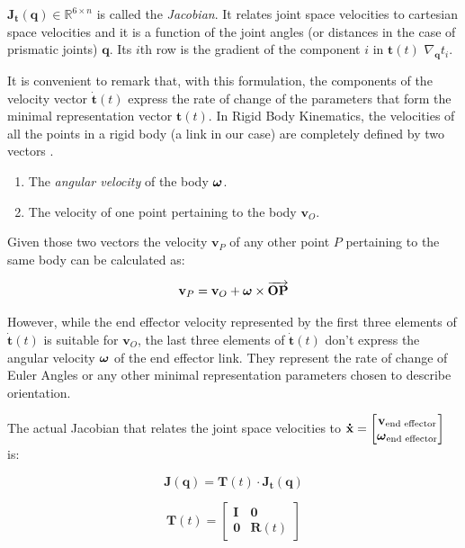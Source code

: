 $\mathbf{J}_{\mathbf{t}}(\mathbf{{q}}) \in \mathbb{R}^{6 \times n}$ is called the \textit{Jacobian}. It relates joint space velocities to cartesian space velocities and it is a function of the joint angles (or distances in the case of prismatic joints) $\mathbf{{q}}$. Its $i$th row is the gradient of the component $i$ in $\mathbf{t}(t)$ $\nabla_{\mathbf{q}}{t}_i$.

It is convenient to remark that, with this formulation, the components of the velocity vector $\mathbf{\dot{t}}(t)$ express the rate of change of the parameters that form the minimal representation vector $\mathbf{t}(t)$. In Rigid Body Kinematics, the velocities of all the points in a rigid body (a link in our case) are completely defined by two vectors \cite{Ruigomez2010}.

\begin{enumerate}
    \item The \textit{angular velocity} of the body $\mbox{\boldmath$\omega$}$.
    \item The velocity of one point pertaining to the body $\mathbf{v}_{O}$.
\end{enumerate}

Given those two vectors the velocity $\mathbf{v}_{P}$ of any other point $P$ pertaining to the same body can be calculated as:

\begin{equation}
\label{eq:velfield}
\mathbf{v}_{P} = \mathbf{v}_{O} + \mbox{\boldmath$\omega$} \times \overrightarrow{\mathbf{OP}}
\end{equation}

However, while the end effector velocity represented by the first three elements of $\mathbf{\dot{t}}(t)$ is suitable for $\mathbf{v}_{O}$, the last three elements of $\mathbf{\dot{t}}(t)$ don't express the angular velocity $\mbox{\boldmath$\omega$}$ of the end effector link. They represent the rate of change of Euler Angles or any other minimal representation parameters chosen to describe orientation.

The actual Jacobian that relates the joint space velocities to $\mathbf{\dot{x}} = \begin{bmatrix} \mathbf{v}_{\text{end effector}} \\ \mbox{\boldmath$\omega$}_{\text{end effector}} \end{bmatrix}$ is:

$$
\mathbf{J}(\mathbf{{q}}) = \mathbf{T}(t) \cdot \mathbf{J}_{\mathbf{t}}(\mathbf{{q}})
$$

$$
\mathbf{T}(t) = \begin{bmatrix}\mathbf{I} & \mathbf{0} \\ \mathbf{0} & \mathbf{R}(t)\end{bmatrix}
$$

